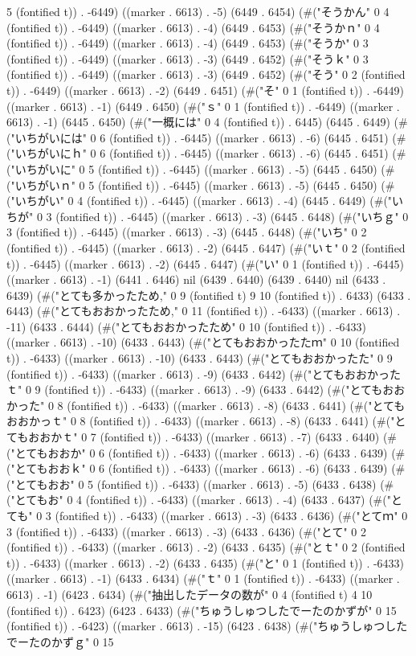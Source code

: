5 (fontified t)) . -6449) ((marker . 6613) . -5) (6449 . 6454) (#("そうかん" 0 4 (fontified t)) . -6449) ((marker . 6613) . -4) (6449 . 6453) (#("そうかｎ" 0 4 (fontified t)) . -6449) ((marker . 6613) . -4) (6449 . 6453) (#("そうか" 0 3 (fontified t)) . -6449) ((marker . 6613) . -3) (6449 . 6452) (#("そうｋ" 0 3 (fontified t)) . -6449) ((marker . 6613) . -3) (6449 . 6452) (#("そう" 0 2 (fontified t)) . -6449) ((marker . 6613) . -2) (6449 . 6451) (#("そ" 0 1 (fontified t)) . -6449) ((marker . 6613) . -1) (6449 . 6450) (#("ｓ" 0 1 (fontified t)) . -6449) ((marker . 6613) . -1) (6445 . 6450) (#("一概には" 0 4 (fontified t)) . 6445) (6445 . 6449) (#("いちがいには" 0 6 (fontified t)) . -6445) ((marker . 6613) . -6) (6445 . 6451) (#("いちがいにｈ" 0 6 (fontified t)) . -6445) ((marker . 6613) . -6) (6445 . 6451) (#("いちがいに" 0 5 (fontified t)) . -6445) ((marker . 6613) . -5) (6445 . 6450) (#("いちがいｎ" 0 5 (fontified t)) . -6445) ((marker . 6613) . -5) (6445 . 6450) (#("いちがい" 0 4 (fontified t)) . -6445) ((marker . 6613) . -4) (6445 . 6449) (#("いちが" 0 3 (fontified t)) . -6445) ((marker . 6613) . -3) (6445 . 6448) (#("いちｇ" 0 3 (fontified t)) . -6445) ((marker . 6613) . -3) (6445 . 6448) (#("いち" 0 2 (fontified t)) . -6445) ((marker . 6613) . -2) (6445 . 6447) (#("いｔ" 0 2 (fontified t)) . -6445) ((marker . 6613) . -2) (6445 . 6447) (#("い" 0 1 (fontified t)) . -6445) ((marker . 6613) . -1) (6441 . 6446) nil (6439 . 6440) (6439 . 6440) nil (6433 . 6439) (#("とても多かったため," 0 9 (fontified t) 9 10 (fontified t)) . 6433) (6433 . 6443) (#("とてもおおかったため," 0 11 (fontified t)) . -6433) ((marker . 6613) . -11) (6433 . 6444) (#("とてもおおかったため" 0 10 (fontified t)) . -6433) ((marker . 6613) . -10) (6433 . 6443) (#("とてもおおかったたｍ" 0 10 (fontified t)) . -6433) ((marker . 6613) . -10) (6433 . 6443) (#("とてもおおかったた" 0 9 (fontified t)) . -6433) ((marker . 6613) . -9) (6433 . 6442) (#("とてもおおかったｔ" 0 9 (fontified t)) . -6433) ((marker . 6613) . -9) (6433 . 6442) (#("とてもおおかった" 0 8 (fontified t)) . -6433) ((marker . 6613) . -8) (6433 . 6441) (#("とてもおおかっｔ" 0 8 (fontified t)) . -6433) ((marker . 6613) . -8) (6433 . 6441) (#("とてもおおかｔ" 0 7 (fontified t)) . -6433) ((marker . 6613) . -7) (6433 . 6440) (#("とてもおおか" 0 6 (fontified t)) . -6433) ((marker . 6613) . -6) (6433 . 6439) (#("とてもおおｋ" 0 6 (fontified t)) . -6433) ((marker . 6613) . -6) (6433 . 6439) (#("とてもおお" 0 5 (fontified t)) . -6433) ((marker . 6613) . -5) (6433 . 6438) (#("とてもお" 0 4 (fontified t)) . -6433) ((marker . 6613) . -4) (6433 . 6437) (#("とても" 0 3 (fontified t)) . -6433) ((marker . 6613) . -3) (6433 . 6436) (#("とてｍ" 0 3 (fontified t)) . -6433) ((marker . 6613) . -3) (6433 . 6436) (#("とて" 0 2 (fontified t)) . -6433) ((marker . 6613) . -2) (6433 . 6435) (#("とｔ" 0 2 (fontified t)) . -6433) ((marker . 6613) . -2) (6433 . 6435) (#("と" 0 1 (fontified t)) . -6433) ((marker . 6613) . -1) (6433 . 6434) (#("ｔ" 0 1 (fontified t)) . -6433) ((marker . 6613) . -1) (6423 . 6434) (#("抽出したデータの数が" 0 4 (fontified t) 4 10 (fontified t)) . 6423) (6423 . 6433) (#("ちゅうしゅつしたでーたのかずが" 0 15 (fontified t)) . -6423) ((marker . 6613) . -15) (6423 . 6438) (#("ちゅうしゅつしたでーたのかずｇ" 0 15 